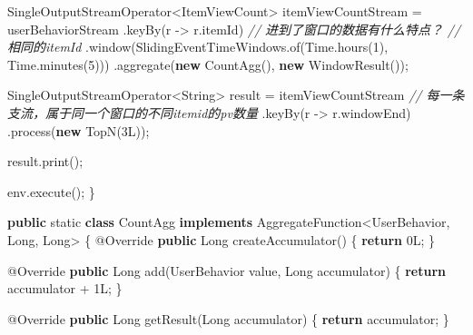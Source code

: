 \documentclass[cn,11pt,chinese]{elegantbook}
\newenvironment{Shaded}{}{}
\newcommand{\AttributeTok}[1]{\textcolor[rgb]{0.49,0.56,0.16}{#1}}
\newcommand{\BuiltInTok}[1]{#1}
\newcommand{\CommentTok}[1]{\textcolor[rgb]{0.38,0.63,0.69}{\textit{#1}}}
\newcommand{\DataTypeTok}[1]{\textcolor[rgb]{0.56,0.13,0.00}{#1}}
\newcommand{\DecValTok}[1]{\textcolor[rgb]{0.25,0.63,0.44}{#1}}
\newcommand{\FunctionTok}[1]{\textcolor[rgb]{0.02,0.16,0.49}{#1}}
\newcommand{\KeywordTok}[1]{\textcolor[rgb]{0.00,0.44,0.13}{\textbf{#1}}}
\newcommand{\NormalTok}[1]{#1}
\begin{document}
\begin{Shaded}
\begin{Highlighting}[]
\NormalTok{        SingleOutputStreamOperator\textless{}ItemViewCount\textgreater{} itemViewCountStream = userBehaviorStream}
\NormalTok{                .}\FunctionTok{keyBy}\NormalTok{(r {-}\textgreater{} r.}\FunctionTok{itemId}\NormalTok{)}
                \CommentTok{// 进到了窗口的数据有什么特点？}
                \CommentTok{// 相同的itemId}
\NormalTok{                .}\FunctionTok{window}\NormalTok{(SlidingEventTimeWindows.}\FunctionTok{of}\NormalTok{(}\BuiltInTok{Time}\NormalTok{.}\FunctionTok{hours}\NormalTok{(}\DecValTok{1}\NormalTok{), }\BuiltInTok{Time}\NormalTok{.}\FunctionTok{minutes}\NormalTok{(}\DecValTok{5}\NormalTok{)))}
\NormalTok{                .}\FunctionTok{aggregate}\NormalTok{(}\KeywordTok{new} \FunctionTok{CountAgg}\NormalTok{(), }\KeywordTok{new} \FunctionTok{WindowResult}\NormalTok{());}

\NormalTok{        SingleOutputStreamOperator\textless{}}\BuiltInTok{String}\NormalTok{\textgreater{} result = itemViewCountStream}
                \CommentTok{// 每一条支流，属于同一个窗口的不同itemid的pv数量}
\NormalTok{                .}\FunctionTok{keyBy}\NormalTok{(r {-}\textgreater{} r.}\FunctionTok{windowEnd}\NormalTok{)}
\NormalTok{                .}\FunctionTok{process}\NormalTok{(}\KeywordTok{new} \FunctionTok{TopN}\NormalTok{(}\DecValTok{3L}\NormalTok{));}

\NormalTok{        result.}\FunctionTok{print}\NormalTok{();}

\NormalTok{        env.}\FunctionTok{execute}\NormalTok{();}
\NormalTok{    \}}

    \KeywordTok{public} \DataTypeTok{static} \KeywordTok{class}\NormalTok{ CountAgg }\KeywordTok{implements}\NormalTok{ AggregateFunction\textless{}UserBehavior, }\BuiltInTok{Long}\NormalTok{, }\BuiltInTok{Long}\NormalTok{\textgreater{} \{}
        \AttributeTok{@Override}
        \KeywordTok{public} \BuiltInTok{Long} \FunctionTok{createAccumulator}\NormalTok{() \{}
            \KeywordTok{return} \DecValTok{0L}\NormalTok{;}
\NormalTok{        \}}

        \AttributeTok{@Override}
        \KeywordTok{public} \BuiltInTok{Long} \FunctionTok{add}\NormalTok{(UserBehavior value, }\BuiltInTok{Long}\NormalTok{ accumulator) \{}
            \KeywordTok{return}\NormalTok{ accumulator + }\DecValTok{1L}\NormalTok{;}
\NormalTok{        \}}

        \AttributeTok{@Override}
        \KeywordTok{public} \BuiltInTok{Long} \FunctionTok{getResult}\NormalTok{(}\BuiltInTok{Long}\NormalTok{ accumulator) \{}
            \KeywordTok{return}\NormalTok{ accumulator;}
\NormalTok{        \}}


\end{Highlighting}
\end{Shaded}
\end{document}
